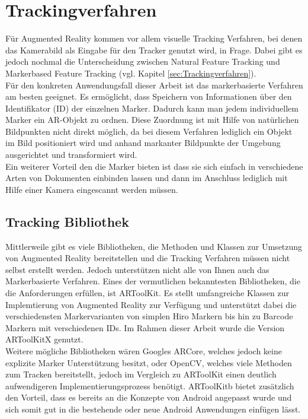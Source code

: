 \section{Trackingverfahren}
Für Augmented Reality kommen vor allem visuelle Tracking Verfahren, bei denen das Kamerabild als Eingabe für den Tracker genutzt wird, in Frage. Dabei gibt es jedoch nochmal die Unterscheidung zwischen Natural Feature Tracking und Markerbased Feature Tracking (vgl. Kapitel \ref{sec:Trackingverfahren}). \\ 
Für den konkreten Anwendungsfall dieser Arbeit ist das markerbasierte Verfahren am besten geeignet. Es ermöglicht, dass Speichern von Informationen über den Identifikator (ID) der einzelnen Marker. Dadurch kann man jedem individuellem Marker ein AR-Objekt zu ordnen. Diese Zuordnung ist mit Hilfe von natürlichen Bildpunkten nicht direkt möglich, da bei diesem Verfahren lediglich ein Objekt im Bild positioniert wird und anhand markanter Bildpunkte der Umgebung ausgerichtet und transformiert wird. \\
Ein weiterer Vorteil den die Marker bieten ist dass sie sich einfach in verschiedene Arten von Dokumenten einbinden lassen und dann im Anschluss lediglich mit Hilfe einer Kamera eingescannt werden müssen. \\
\subsection{Tracking Bibliothek}
Mittlerweile gibt es viele Bibliotheken, die Methoden und Klassen zur Umsetzung von Augmented Reality bereitstellen und die Tracking Verfahren müssen nicht selbst erstellt werden. Jedoch unterstützen nicht alle von Ihnen auch das Markerbasierte Verfahren. Eines der vermutlichen bekanntesten Bibliotheken, die die Anforderungen erfüllen, ist ARToolKit. Es stellt umfangreiche Klassen zur Implemtierung von Augmented Reality zur Verfügung und unterstützt dabei die verschiedensten Markervarianten von simplen Hiro Markern bis hin zu Barcode Markern mit verschiedenen IDs.
Im Rahmen dieser Arbeit wurde die Version ARToolKitX genutzt. \\
Weitere mögliche Bibliotheken wären Googles ARCore, welches jedoch keine explizite Marker Unterstützung besitzt, oder OpenCV, welches viele Methoden zum Tracken bereitstellt, jedoch im Vergleich zu ARToolKit einen deutlich aufwendigeren Implementierungsprozess benötigt. ARToolKitb bietet zusätzlich den Vorteil, dass es bereits an die Konzepte von Android angepasst wurde und sich somit gut in die bestehende oder neue Android Anwendungen einfügen lässt.\\

